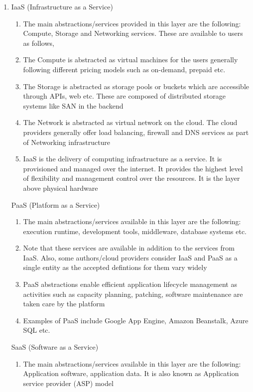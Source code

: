 \documentclass[11pt,a4paper,oneside]{article}
\begin{document}
\begin{enumerate}
       \item IaaS (Infrastructure as a Service)
             \begin{enumerate}
             	\item The main abstractions/services provided in this layer are the following: Compute, Storage and Networking services. These are available to users as follows,
             	\item The Compute is abstracted as virtual machines for the users generally following different pricing models such as on-demand, prepaid etc.
             	\item The Storage is abstracted as storage pools or buckets which are accessible through APIs, web etc. These are composed of distributed storage systems like SAN in the backend
             	\item The Network is abstracted as virtual network on the cloud. The cloud providers generally offer load balancing, firewall and DNS services as part of Networking infrastructure
                \item IaaS is the delivery of computing infrastructure as a service. It is provisioned and managed over the internet. It provides the highest level of flexibility and management control over the resources. It is the layer above physical hardware
             \end{enumerate}
             PaaS (Platform as a Service)
             \begin{enumerate}
             	\item The main abstractions/services available in this layer are the following: execution runtime, development tools, middleware, database systems etc.
             	\item Note that these services are available in addition to the services from IaaS. Also, some authors/cloud providers consider IaaS and PaaS as a single entity as the accepted defintions for them vary widely
             	\item PaaS abstractions enable efficient application lifecycle management as activities such as capacity planning, patching, software maintenance are taken care by the platform
             	\item Examples of PaaS include Google App Engine, Amazon Beanstalk, Azure SQL etc. 
             \end{enumerate}
             SaaS (Software as a Service)
             \begin{enumerate}
             	\item The main abstractions/services available in this layer are the following: Application software, application data. It is also known as Application service provider (ASP) model

\end{enumerate}
\end{enumerate}
\end{document}
